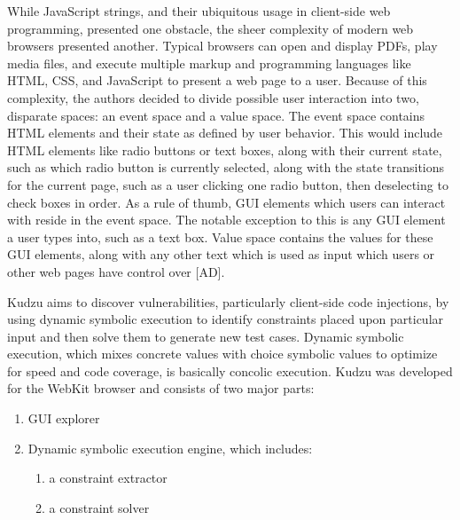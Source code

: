 \documentclass[11pt,expanded,copyright]{fsuthesis}
\begin{document}
While JavaScript strings, and their ubiquitous usage in client-side web programming, presented one obstacle, the sheer complexity of modern web browsers presented another. Typical browsers can open and display PDFs, play media files, and execute multiple markup and programming languages like HTML, CSS, and JavaScript to present a web page to a user. Because of this complexity, the authors decided to divide possible user interaction into two, disparate spaces: an event space and a value space. The event space contains HTML elements and their state as defined by user behavior. This would include HTML elements like radio buttons or text boxes, along with their current state, such as which radio button is currently selected, along with the state transitions for the current page, such as a user clicking one radio button, then deselecting to check boxes in order. As a rule of thumb, GUI elements which users can interact with reside in the event space. The notable exception to this is any GUI element a user types into, such as a text box. Value space contains the values for these GUI elements, along with any other text which is used as input which users or other web pages have control over [AD].

Kudzu aims to discover vulnerabilities, particularly client-side code injections, by using dynamic symbolic execution to identify constraints placed upon particular input and then solve them to generate new test cases. Dynamic symbolic execution, which mixes concrete values with choice symbolic values to optimize for speed and code coverage, is basically concolic execution. Kudzu was developed for the WebKit browser and consists of two major parts:
\begin{enumerate}
	\item GUI explorer
	\item Dynamic symbolic execution engine, which includes:
	\begin{enumerate}
		\item a constraint extractor
		\item a constraint solver
	\end{enumerate}
\end{enumerate}
\end{document}

